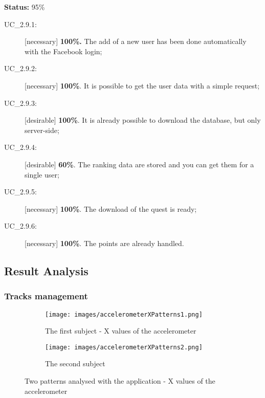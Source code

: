 \textbf{Status:} 95\%
		\begin{description}
			\item[UC\_2.9.1:] [necessary] \textbf{100\%.} The add of a new user has been done automatically with the Facebook login;
			\item[UC\_2.9.2:] [necessary] \textbf{100\%}. It is possible to get the user data with a simple request;
			\item[UC\_2.9.3:] [desirable] \textbf{100\%}. It is already possible to download the database, but only server-side;
			\item[UC\_2.9.4:] [desirable] \textbf{60\%}. The ranking data are stored and you can get them for a single user;
			\item[UC\_2.9.5:] [necessary] \textbf{100\%}. The download of the quest is ready;
			\item[UC\_2.9.6:] [necessary] \textbf{100\%}. The points are already handled.
		\end{description}

\subsection{Result Analysis}
\subsubsection{Tracks management}

\begin{figure}[H]   
        \begin{subfigure}[b]{\textwidth}
                \centering
\texttt{[image: images/accelerometerXPatterns1.png]}
\caption{The first subject - X values of the accelerometer}
\label{fig:firstSubjectPatterns}
        \end{subfigure}

        \begin{subfigure}[b]{\textwidth}
                \centering
\texttt{[image: images/accelerometerXPatterns2.png]}
\caption{The second subject}
\label{fig:secondSubjectPatterns}
        \end{subfigure}
        \caption{Two patterns analysed with the application - X values of the accelerometer}
        \label{fig:secondSubjectPatterns}
\end{figure}

